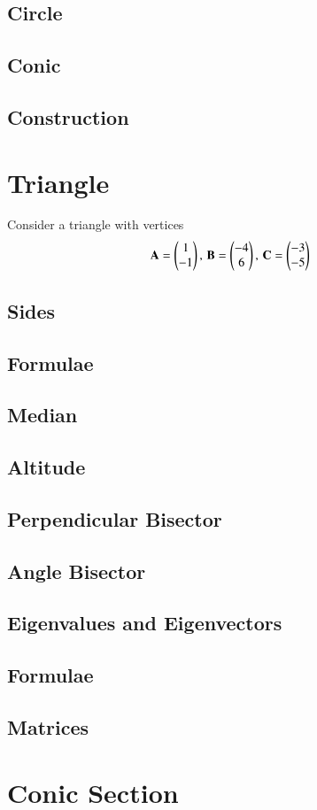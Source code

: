 \documentclass[journal]{IEEEtran}
\begin{document}
\subsection{Circle}

\subsection{Conic}

\subsection{Construction}

%
\appendices
\section{Triangle}
Consider a triangle with vertices
		\begin{align}
			\label{eq:app-tri-pts}
			\mathbf{A} = \begin{pmatrix}1 \\ -1\end{pmatrix},\,
			\mathbf{B} = \begin{pmatrix}-4 \\ 6\end{pmatrix},\,
			\mathbf{C} = \begin{pmatrix}-3 \\ -5\end{pmatrix}
		\end{align}
\subsection{Sides}

\subsection{Formulae}

\subsection{Median}

\subsection{Altitude}

\subsection{Perpendicular Bisector}

\subsection{Angle Bisector}

\subsection{Eigenvalues and Eigenvectors}

\subsection{Formulae}

\subsection{Matrices}

\newpage
\section{Conic Section}

\end{document}

